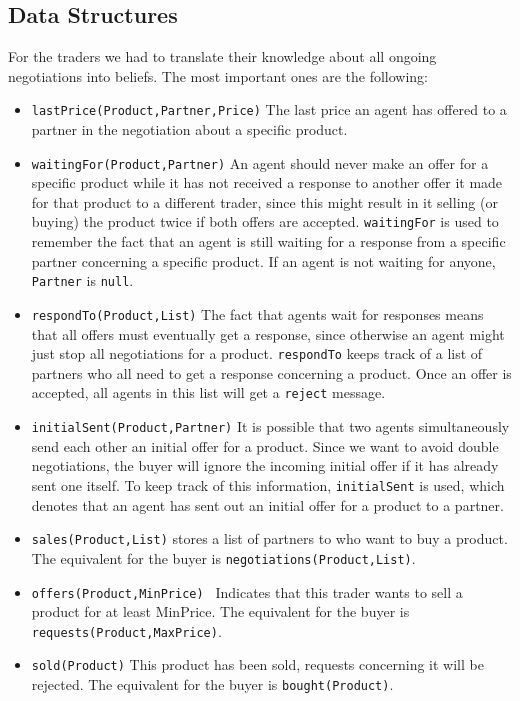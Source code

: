 \documentclass[a4paper,11pt]{article}
\begin{document}
\subsection{Data Structures}
For the traders we had to translate their knowledge about all ongoing negotiations into beliefs. The most important ones are the following:
\begin{itemize}
  \item \texttt{lastPrice(Product,Partner,Price)} The last price an agent has offered to a partner in the negotiation about a specific product.
  \item \texttt{waitingFor(Product,Partner)} An agent should never make an offer for a specific product while it has not received a response to another offer it made for that product to a different trader, since this might result in it selling (or buying) the product twice if both offers are accepted. \texttt{waitingFor} is used to remember the fact that an agent is still waiting for a response from a specific partner concerning a specific product. If an agent is not waiting for anyone, \texttt{Partner} is \texttt{null}.
 \item \texttt{respondTo(Product,List)} The fact that agents wait for responses means that all offers must eventually get a response, since otherwise an agent might just stop all negotiations for a product. \texttt{respondTo} keeps track of a list of partners who all need to get a response concerning a product. Once an offer is accepted, all agents in this list will get a \texttt{reject} message.
\item \texttt{initialSent(Product,Partner)} It is possible that two agents simultaneously send each other an initial offer for a product. Since we want to avoid double negotiations, the buyer will ignore the incoming initial offer if it has already sent one itself. To keep track of this information, \texttt{initialSent} is used, which denotes that an agent has sent out an initial offer for a product to a partner.
\item \texttt{sales(Product,List)} stores a list of partners to who want to buy a product. The equivalent for the buyer is \texttt{negotiations(Product,List)}.
\item \texttt{offers(Product,MinPrice) } Indicates that this trader wants to sell a product for
at least MinPrice. The equivalent for the buyer is \texttt{requests(Product,MaxPrice)}.
\item \texttt{sold(Product)} This product has been sold, requests concerning it will be
rejected. The equivalent for the buyer is \texttt{bought(Product)}.
\end{itemize}
\end{document}
